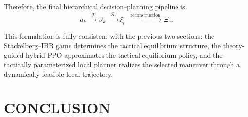 \documentclass[final ,3p, times]{elsarticle}
\begin{document}
Therefore, the final hierarchical decision--planning pipeline is
\begin{equation}
a_k
\;\xrightarrow{\;\mathcal{T}\;}
\vartheta_k
\;\xrightarrow{\;\mathcal{R}_e\;}
\xi_e^\star
\;\xrightarrow{\;\text{reconstruction}\;}
\Xi_e.
\label{eq:final_pipeline_revised}
\end{equation}

This formulation is fully consistent with the previous two sections: the Stackelberg--IBR game determines the tactical equilibrium structure, the theory-guided hybrid PPO approximates the tactical equilibrium policy, and the tactically parameterized local planner realizes the selected maneuver through a dynamically feasible local trajectory.












\section{CONCLUSION}


\end{document}
